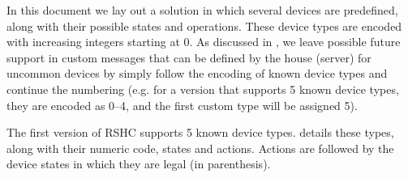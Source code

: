 In this document we lay out a solution in which several devices are predefined, along with their possible states and operations. These device types are encoded with increasing integers starting at 0. As discussed in , we leave possible future support in custom messages that can be defined by the house (server) for uncommon devices by simply follow the encoding of known device types and continue the numbering (e.g. for a version that supports 5 known device types, they are encoded as 0--4, and the first custom type will be assigned 5).

The first version of RSHC supports 5 known device types.  details these types, along with their numeric code, states and actions. Actions are followed by the device states in which they are legal (in parenthesis).

